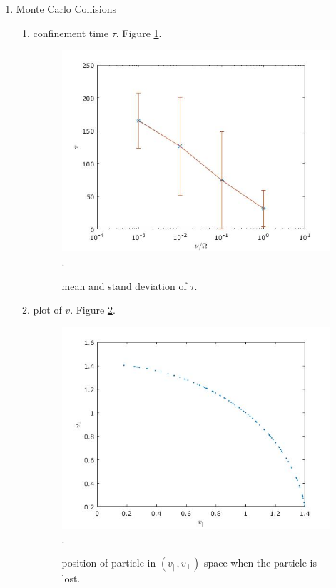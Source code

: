 \documentclass{article}
\begin{document}
\begin{enumerate}
\begin{enumerate}
\end{enumerate}

\item
Monte Carlo Collisions

\begin{enumerate}
\item confinement time $\tau$. Figure \ref{2-1}.

\begin{figure}[h]
\centering
\includegraphics[scale=0.4]{problem2/confinement_time.jpg}.
\label{2-1}
\caption{mean and stand deviation of $\tau$.}
\end{figure}

\item plot of $v$. Figure \ref{2-2}.

\begin{figure}[h]
\centering
\includegraphics[scale=0.4]{problem2/v.jpg}.
\label{2-2}
\caption{position of particle in $(v_\parallel, v_\perp)$ space when the particle is lost.}
\end{figure}

\end{enumerate}

\end{enumerate}
\end{document}
